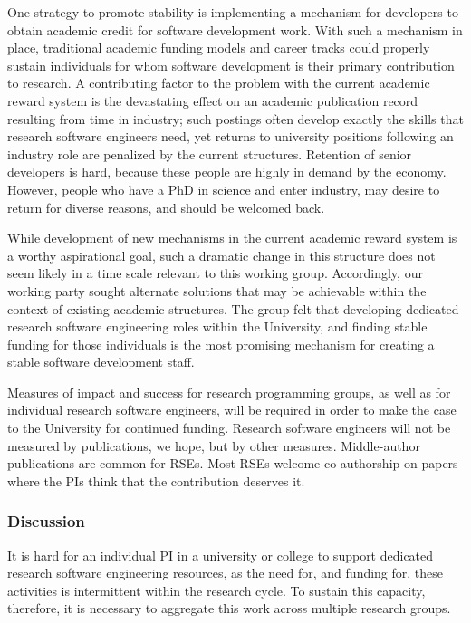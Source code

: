 One strategy to promote stability is implementing a mechanism for developers to obtain academic
credit for software development work. With such a mechanism in place, traditional academic funding
models and career tracks could properly sustain individuals for whom software development is their
primary contribution to research. A contributing factor to the problem with the current academic reward system is the
devastating effect on an academic
publication record resulting from time in industry; such postings often develop exactly the skills that research software
engineers need, yet returns to university positions following an industry role are penalized by the current structures.
Retention of senior developers is hard, because these people are highly in demand by the economy. However, people who have a
PhD in science and enter industry, may desire to return for diverse reasons, and should be welcomed back.

While development of new mechanisms in the current academic reward system is a worthy aspirational goal, such a dramatic
change in this structure does not seem likely in a time scale relevant to this working group. Accordingly, our working party
sought alternate solutions that may be achievable within the context of existing academic structures. The group felt that
developing dedicated research software engineering roles within the University, and finding stable funding for those individuals is the most promising mechanism for creating a stable software development staff.

Measures of impact and success for research programming groups, as well as for individual research software engineers, will
be required in order to make the case to the University for continued funding. Research software engineers will not be measured by publications, we hope, but by other measures. Middle-author publications are common for RSEs. Most RSEs welcome co-authorship on papers where the PIs think that the contribution deserves it.

\subsubsection{Discussion}

It is hard for an individual PI in a university or college to support dedicated research software engineering resources, as
the need for, and funding for, these activities is intermittent within the research cycle. To sustain this capacity, therefore, it is necessary to aggregate this work across multiple research groups.

